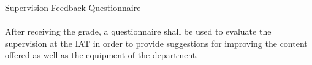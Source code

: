 \begin{aufgabenstellung}
\underline{Supervision Feedback Questionnaire}\\ \\
After receiving the grade, a questionnaire shall be used to evaluate the supervision at the IAT in order to provide suggestions for improving the content offered as well as the equipment of the department.

\end{aufgabenstellung}
